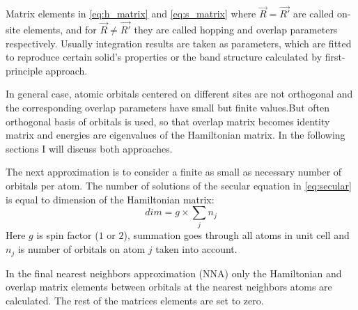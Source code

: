Matrix elements in \ref{eq:h_matrix} and \ref{eq:s_matrix} where $\vec{R} = \vec{R'}$ are called on-site elements, and for $\vec{R} \neq \vec{R'}$ they are called hopping and overlap parameters respectively. Usually integration results are taken as parameters, which are fitted to reproduce certain solid's properties or the band structure calculated by first-principle approach. 

In general case, atomic orbitals centered on different sites are not orthogonal and the corresponding overlap parameters have small but finite values.But often orthogonal basis of orbitals is used, so that overlap matrix becomes identity matrix and energies are eigenvalues of the Hamiltonian matrix. In the following sections I will discuss both approaches. 

The next approximation is to consider a finite as small as necessary number of orbitals per atom. The number of solutions of the secular equation in \ref{eq:secular} is equal to dimension of the Hamiltonian matrix: 
\begin{equation}
dim = g \times \sum_j n_j
\end{equation}
Here $g$ is spin factor ($1$ or $2$), summation goes through all atoms in unit cell and $n_j$ is number of orbitals on atom $j$ taken into account.

In the final nearest neighbors approximation (NNA) only the Hamiltonian and overlap matrix elements between orbitals at the nearest neighbors atoms are calculated. The rest of the matrices elements are set to zero.

